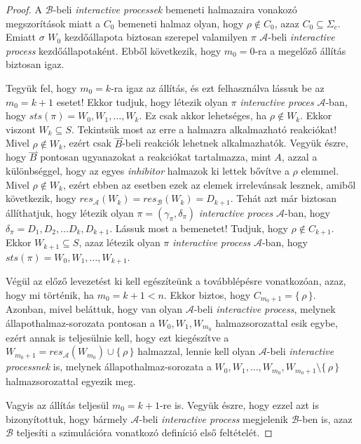 \documentclass[12pt]{article}
\theoremstyle{definition}
\theoremstyle{remark}
\theoremstyle{plain}
\theoremstyle{plain}
\newcommand{\forwardhat}{\overset{\rightharpoonup}}
\newcommand{\res}{\textit{res}}
\begin{document}
\begin{proof}
        A $\mathscr{B}$-beli \textit{interactive processek} bemeneti halmazaira vonakozó megszorítások miatt a $C_{0}$ bemeneti halmaz olyan, hogy $\rho \notin C_{0}$, azaz $C_{0} \subseteq \Sigma_{c}$. Emiatt $\sigma$ $W_{0}$ kezdőállapota biztosan szerepel valamilyen $\pi$ $\mathscr{A}$-beli \textit{interactive process} kezdőállapotaként. Ebből következik, hogy $m_{0} = 0$-ra a megelőző állítás biztosan igaz.
        
        Tegyük fel, hogy $m_{0} = k$-ra igaz az állítás, és ezt felhasználva lássuk be az $m_{0} = k + 1$ esetet! Ekkor tudjuk, hogy létezik olyan $\pi$ \textit{interactive proces} $\mathscr{A}$-ban, hogy $\textit{sts}(\pi) = W_{0}, W_{1}, \ldots, W_{k}$. Ez csak akkor lehetséges, ha $\rho \notin W_{k}$. Ekkor viszont $W_{k} \subseteq S$. Tekintsük most az erre a halmazra alkalmazható reakciókat! Mivel $\rho \notin W_{k}$, ezért csak $\forwardhat B$-beli reakciók lehetnek alkalmazhatók. Vegyük észre, hogy $\forwardhat B$ pontosan ugyanazokat a reakciókat tartalmazza, mint $A$, azzal a különbséggel, hogy az egyes \textit{inhibitor} halmazok ki lettek bővítve a $\rho$ elemmel. Mivel $\rho \notin W_{k}$, ezért ebben az esetben ezek az elemek irrelevánsak lesznek, amiből következik, hogy $\res_{\mathscr{A}}(W_{k}) = \res_{\mathscr{B}}(W_{k}) = D_{k + 1}$. Tehát azt már biztosan állíthatjuk, hogy létezik olyan $\pi = (\gamma_{\pi}, \delta_{\pi})$ \textit{interactive proces} $\mathscr{A}$-ban, hogy $\delta_{\pi} = D_{1}, D_{2}, \ldots D_{k}, D_{k + 1}$. Lássuk most a bemenetet! Tudjuk, hogy $\rho \notin C_{k + 1}$. Ekkor $W_{k + 1} \subseteq S$, azaz létezik olyan $\pi$ \textit{interactive process} $\mathscr{A}$-ban, hogy $\textit{sts}(\pi)=W_{0}, W_{1}, \ldots, W_{k + 1}$.

        Végül az előző levezetést ki kell egészíteünk a továbblépésre vonatkozóan, azaz, hogy mi történik, ha $m_{0} = k + 1 < n$. Ekkor biztos, hogy $C_{m_{0} + 1} = \{\,\rho\,\}$. Azonban, mivel beláttuk, hogy van olyan $\mathscr{A}$-beli \textit{interactive process}, melynek állapothalmaz-sorozata pontosan a $W_{0}, W_{1}, W_{m_{0}}$ halmazsorozattal esik egybe, ezért annak is teljesülnie kell, hogy ezt kiegészítve a $W_{m_{0} + 1} = \res_{\mathscr{A}}(W_{m_{0}}) \cup \{\,\rho\,\}$ halmazzal, lennie kell olyan $\mathscr{A}$-beli \textit{interactive processnek} is, melynek állapothalmaz-sorozata a $W_{0}, W_{1}, \ldots, W_{m_{0}}, W_{m_{0} + 1} \setminus \{\,\rho\,\}$ halmazsorozattal egyezik meg.

        Vagyis az állítás teljesül $m_{0} = k + 1$-re is. Vegyük észre, hogy ezzel azt is bizonyítottuk, hogy bármely $\mathscr{A}$-beli \textit{interactive process} megjelenik $\mathscr{B}$-ben is, azaz $\mathscr{B}$ teljesíti a szimulációra vonatkozó definíció első feltételét.
        

\end{proof}
\end{document}
